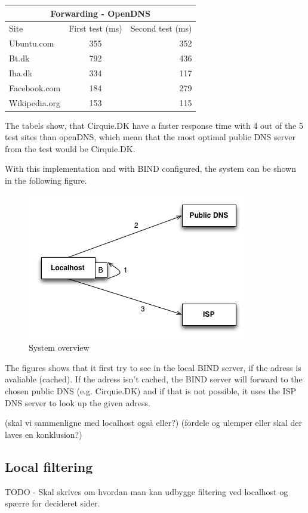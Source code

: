 \documentclass[Preamble]{subfiles}
\begin{document}
\begin{center}
  \begin{tabular}{ l | c  | r}
    \multicolumn{3}{c}{Forwarding - OpenDNS}  \\
	\hline Site & First test (ms) & Second test (ms) \\     
    \hline
    Ubuntu.com & 355 & 352  \\ \hline
    Bt.dk & 792 & 436  \\ \hline
	Iha.dk & 334 & 117 \\ \hline
	Facebook.com & 184 & 279 \\ \hline
	Wikipedia.org & 153 & 115 \\ \hline
  \end{tabular}
\end{center}

The tabels show, that Cirquie.DK have a faster response time with 4 out of the 5 test sites than openDNS, which mean that the most optimal public DNS server from the test would be Cirquie.DK. 

With this implementation and with BIND configured, the system can be shown in the following figure.

\begin{figure}[hbtp]
\centering
\includegraphics[scale=0.5]{../../Protoypes/DNS/ForwardingDiagram.jpg}
\caption{System overview}
\end{figure}


The figures shows that it first try to see in the local BIND server, if the adress is avaliable (cached). If the adress isn't cached, the BIND server will forward to the chosen public DNS (e.g. Cirquie.DK) and if that is not possible, it uses the ISP DNS server to look up the given adress. 

(skal vi sammenligne med localhost også eller?)
(fordele og ulemper eller skal der laves en konklusion?)


\subsection{Local filtering}
TODO - Skal skrives om hvordan man kan udbygge filtering ved localhost og spærre for decideret sider. 
\end{document}
